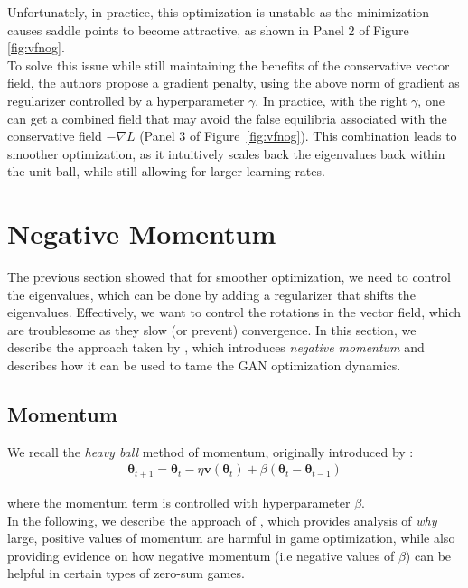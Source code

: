 \documentclass{article}
\renewcommand{\vec}[1]{\ensuremath{\boldsymbol{#1}}}
\begin{document}
Unfortunately, in practice, this optimization is unstable as the minimization causes saddle points to become attractive, as shown in Panel 2 of Figure \ref{fig:vfnog}.
\\

To solve this issue while still maintaining the benefits of the conservative vector field, the authors propose a gradient penalty, using the above norm of gradient as regularizer controlled by a hyperparameter $\gamma$. In practice, with the right $\gamma$, one can get a combined field that may avoid the false equilibria associated with the conservative field $-\nabla L$ (Panel 3 of Figure~\ref{fig:vfnog}). This combination leads to smoother optimization, as it intuitively scales back the eigenvalues back within the unit ball, while still allowing for larger learning rates.

\section{Negative Momentum}

The previous section showed that for smoother optimization, we need to control the eigenvalues, which can be done by adding a regularizer that shifts the eigenvalues. Effectively, we want to control the rotations in the vector field, which are troublesome as they slow (or prevent) convergence. In this section, we describe the approach taken by \cite{Gidel18NegMom}, which introduces \textit{negative momentum} and describes how it can be used to tame the GAN optimization dynamics.

\subsection{Momentum}
We recall the \textit{heavy ball} method of momentum, originally introduced by \cite{POLYAK19641}:
\begin{align}
\vec{\theta}_{t+1} = \vec{\theta}_t - \eta\vec{v}(\vec{\theta}_t) + \beta(\vec{\theta}_t - \vec{\theta}_{t-1})
\end{align}

where the momentum term is controlled with hyperparameter $\beta$.
\\

In the following, we describe the approach of \cite{Gidel18NegMom}, which provides analysis of \textit{why} large, positive values of momentum are harmful in game optimization, while also providing evidence on how negative momentum (i.e negative values of $\beta$) can be helpful in certain types of zero-sum games.
\\
\end{document}

